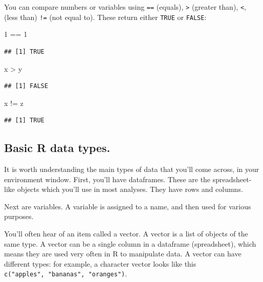 \documentclass[
]{book}
\newenvironment{Shaded}{\begin{snugshade}}{\end{snugshade}}
\newcommand{\DecValTok}[1]{\textcolor[rgb]{0.00,0.00,0.81}{#1}}
\newcommand{\NormalTok}[1]{#1}
\newcommand{\SpecialCharTok}[1]{\textcolor[rgb]{0.00,0.00,0.00}{#1}}
\begin{document}
You can compare numbers or variables using \texttt{==} (equals), \texttt{\textgreater{}} (greater than), \texttt{\textless{}}, (less than) \texttt{!=} (not equal to). These return either \texttt{TRUE} or \texttt{FALSE}:

\begin{Shaded}
\begin{Highlighting}[]
\DecValTok{1} \SpecialCharTok{==} \DecValTok{1}
\end{Highlighting}
\end{Shaded}

\begin{verbatim}
## [1] TRUE
\end{verbatim}

\begin{Shaded}
\begin{Highlighting}[]
\NormalTok{x }\SpecialCharTok{\textgreater{}}\NormalTok{ y}
\end{Highlighting}
\end{Shaded}

\begin{verbatim}
## [1] FALSE
\end{verbatim}

\begin{Shaded}
\begin{Highlighting}[]
\NormalTok{x }\SpecialCharTok{!=}\NormalTok{ z}
\end{Highlighting}
\end{Shaded}

\begin{verbatim}
## [1] TRUE
\end{verbatim}

\hypertarget{basic-r-data-types.}{%
\subsection{Basic R data types.}\label{basic-r-data-types.}}

It is worth understanding the main types of data that you'll come across, in your environment window. First, you'll have dataframes. These are the spreadsheet-like objects which you'll use in most analyses. They have rows and columns.

Next are variables. A variable is assigned to a name, and then used for various purposes.

You'll often hear of an item called a vector. A vector is a list of objects of the same type. A vector can be a single column in a dataframe (spreadsheet), which means they are used very often in R to manipulate data. A vector can have different types: for example, a character vector looks like this \texttt{c("apples",\ "bananas",\ "oranges")}.
\end{document}
